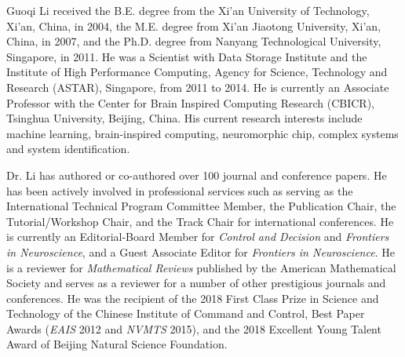 \documentclass[10pt,journal,compsoc]{IEEEtran}
\begin{document}
\begin{IEEEbiography}{Guoqi Li}  received the B.E. degree from the Xi’an University of Technology, Xi’an, China, in 2004, the M.E. degree from Xi’an Jiaotong University, Xi’an, China, in 2007, and the Ph.D. degree from Nanyang Technological University, Singapore, in 2011. He was a Scientist with Data Storage Institute and the Institute of High Performance Computing, Agency for Science, Technology and Research (ASTAR), Singapore, from 2011 to 2014. He is currently an Associate Professor with the Center for Brain Inspired Computing Research (CBICR), Tsinghua University, Beijing, China. His current research interests include machine learning, brain-inspired computing, neuromorphic chip, complex systems and system identification. 

Dr. Li has authored or co-authored over 100 journal and conference papers. He has been actively involved in professional services such as serving as the International Technical Program Committee Member, the Publication Chair, the Tutorial/Workshop Chair, and the Track Chair for international conferences. He is currently an Editorial-Board Member for \emph{Control and Decision} and \emph{Frontiers in Neuroscience}, and a Guest Associate Editor for \emph{Frontiers in Neuroscience}. He is a reviewer for \emph{Mathematical Reviews} published by the American Mathematical Society and serves as a reviewer for a number of other prestigious journals and conferences. He was the recipient of the 2018 First Class Prize in Science and Technology of the Chinese Institute of Command and Control, Best Paper Awards (\emph{EAIS} 2012 and \emph{NVMTS} 2015), and the 2018 Excellent Young Talent Award of Beijing Natural Science Foundation.
\end{IEEEbiography}
\vspace{-40pt}
\end{document}
